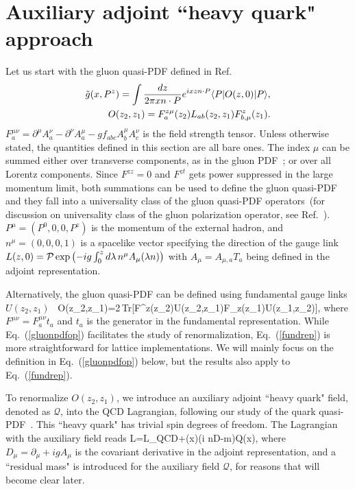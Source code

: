 \section{Auxiliary adjoint ``heavy quark" approach}\label{sec:aux}

Let us start with the gluon quasi-PDF defined in Ref.~\cite{Ji:2013dva}
\begin{align}\label{gluonpdfop}
\tilde g(x, P^z)=\int\frac{dz}{2\pi x n\cdot P}e^{i x z n\cdot P}\langle P|O(z,0)|P\rangle,\nonumber\\
O(z_2,z_1)=F_a^{z\mu}(z_2)L_{ab}(z_2, z_1)F_{b,\mu}^z(z_1).
\end{align}
$F_a^{\mu\nu}=\partial^\mu A_a^{\nu}-\partial^\nu A_a^\mu-g f_{abc}A_b^\mu A_c^\nu$ is the field strength tensor. Unless otherwise stated, the quantities defined in this section are all bare ones. The index $\mu$ can be summed either over transverse components, as in the gluon PDF~\cite{Collins:1984xc}; or over all Lorentz components. Since $F^{zz}=0$ and $F^{zt}$ gets power suppressed in the large momentum limit, both summations can be used to define the gluon quasi-PDF and they fall into a universality class of the gluon quasi-PDF operators~(for discussion on universality class of the gluon polarization operator, see Ref.~\cite{Hatta:2013gta}). $P^\mu=(P^0, 0,0, P^z)$ is the momentum of the external hadron, and $n^\mu=(0,0,0,1)$ is a spacelike vector specifying the direction of the gauge link $L(z, 0) = {\cal P}\exp\left(-ig\int^z_0 d\lambda\,n^\mu  A_\mu(\lambda n)\right)$ with $A_\mu=A_{\mu, a}T_a$ being defined in the adjoint representation.

Alternatively, the gluon quasi-PDF can be defined using fundamental gauge links $U(z_2,z_1)$~\cite{Dorn:1981wa}
\beq\label{fundrep}
\hspace*{-1em}O(z_2,z_1)=2\,{\rm Tr}[F^{z\mu}(z_2)U(z_2,z_1)F_{z\mu}(z_1)U(z_1,z_2)],
\eeq
where $F^{\mu\nu}=F_{a}^{\mu\nu}t_a$ and $t_a$ is the generator in the fundamental representation.
While Eq.~(\ref{gluonpdfop}) facilitates the study of renormalization, Eq.~(\ref{fundrep}) is more straightforward for lattice implementations. We will mainly focus on the definition in Eq.~(\ref{gluonpdfop}) below, but the results also apply to Eq.~({\ref{fundrep}}).

To renormalize $O(z_2,z_1)$, we introduce an auxiliary adjoint ``heavy quark" field, denoted as $\mathcal Q$, into the QCD Lagrangian, following our study of the quark quasi-PDF~\cite{Ji:2017oey}. This ``heavy quark" has trivial spin degrees of freedom. The Lagrangian with the auxiliary field reads
\beq\label{efflag}
\mathcal L=\mathcal L_{\rm{QCD}}+(x)(i n\cdot D-m)\mathcal Q(x),
\eeq
where $D_\mu=\partial_\mu+ig A_{\mu}$ is the covariant derivative in the adjoint representation, and a ``residual mass" is introduced for the auxiliary field $\mathcal Q$, for reasons that will become clear later.

